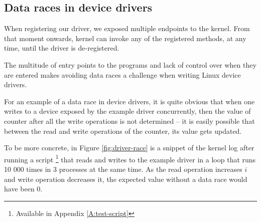 \documentclass[..thesis.tex]{subfiles}
\begin{document}


\subsection{Data races in device drivers}



When registering our driver, we exposed multiple endpoints to the kernel. From that moment onwards, kernel can invoke any of the registered methods, at any time, until the driver is de-registered. 


The multitude of entry points to the programs and lack of control over when they are entered makes avoiding data races a challenge when writing Linux device drivers. 

For an example of a data race in device drivers, it is quite obvious that when one writes to a device exposed by the example driver concurrently, then the value of counter after all the write operations is not determined -- it is easily possible that between the read and write operations of the counter, its value gets updated.

To be more concrete, in Figure \ref{fig:driver-race} is a snippet of the kernel log after running a script \footnote{Available in Appendix \ref{A:test-script}} that reads and writes to the example driver in a loop that
runs 10 000 times in 3 processes at the same time. As the read operation increases $i$ and write operation decreases it, the expected value without a data race would have been $0$.


\end{document}
